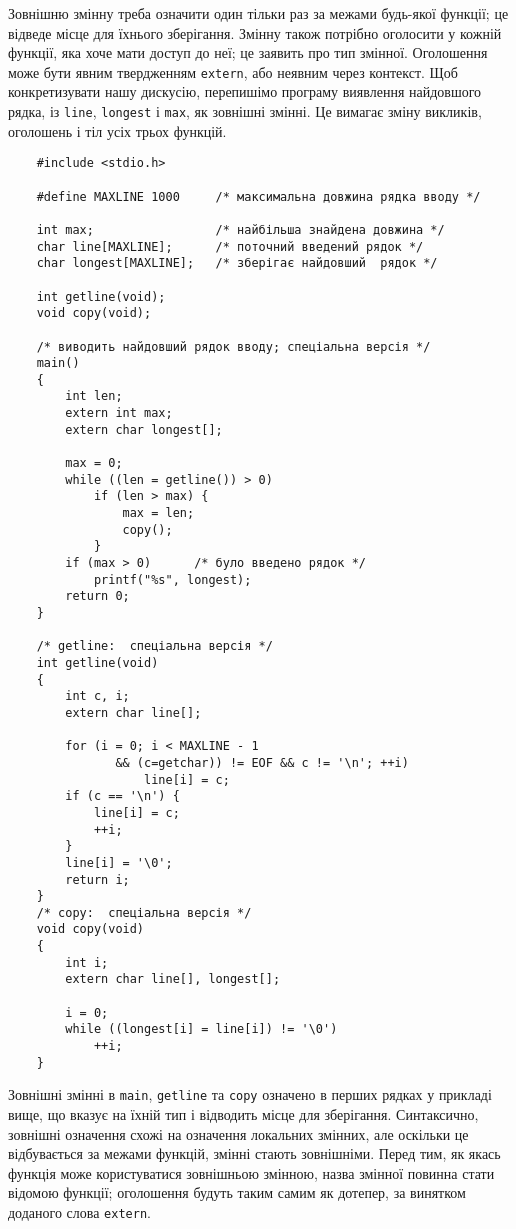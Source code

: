 \documentclass[a4paper,12pt]{book}
\begin{document}
  Зовнішню змінну треба означити один тільки раз за межами будь-якої функції; це відведе
  місце для їхнього зберігання. Змінну також потрібно оголосити у кожній функції, яка хоче
  мати доступ до неї; це заявить про тип змінної. Оголошення може бути явним твердженням
  \texttt{extern}, або неявним через контекст. Щоб конкретизувати нашу дискусію,
  перепишімо програму виявлення найдовшого рядка, із \texttt{line}, \texttt{longest} і
  \texttt{max}, як зовнішні змінні. Це вимагає зміну викликів, оголошень і тіл усіх трьох
  функцій.

  \begin{verbatim}
    #include <stdio.h>

    #define MAXLINE 1000     /* максимальна довжина рядка вводу */

    int max;                 /* найбільша знайдена довжина */
    char line[MAXLINE];      /* поточний введений рядок */
    char longest[MAXLINE];   /* зберігає найдовший  рядок */

    int getline(void);
    void copy(void);

    /* виводить найдовший рядок вводу; спеціальна версія */
    main()
    {
        int len;
        extern int max;
        extern char longest[];

        max = 0;
        while ((len = getline()) > 0)
            if (len > max) {
                max = len;
                copy();
            }
        if (max > 0)      /* було введено рядок */
            printf("%s", longest);
        return 0;
    }

    /* getline:  спеціальна версія */
    int getline(void)
    {
        int c, i;
        extern char line[];

        for (i = 0; i < MAXLINE - 1
               && (c=getchar)) != EOF && c != '\n'; ++i)
                   line[i] = c;
        if (c == '\n') {
            line[i] = c;
            ++i;
        }
        line[i] = '\0';
        return i;
    }
    /* copy:  спеціальна версія */
    void copy(void)
    {
        int i;
        extern char line[], longest[];

        i = 0;
        while ((longest[i] = line[i]) != '\0')
            ++i;
    }
  \end{verbatim}

  Зовнішні змінні в \texttt{main}, \texttt{getline} та \texttt{copy} означено в перших
  рядках у прикладі вище, що вказує на їхній тип і відводить місце для зберігання.
  Синтаксично, зовнішні означення схожі на означення локальних змінних, але оскільки це
  відбувається за межами функцій, змінні стають зовнішніми. Перед тим, як якась функція
  може користуватися зовнішньою змінною, назва змінної повинна стати відомою функції;
  оголошення будуть таким самим як дотепер, за винятком доданого слова \texttt{extern}.
\end{document}
